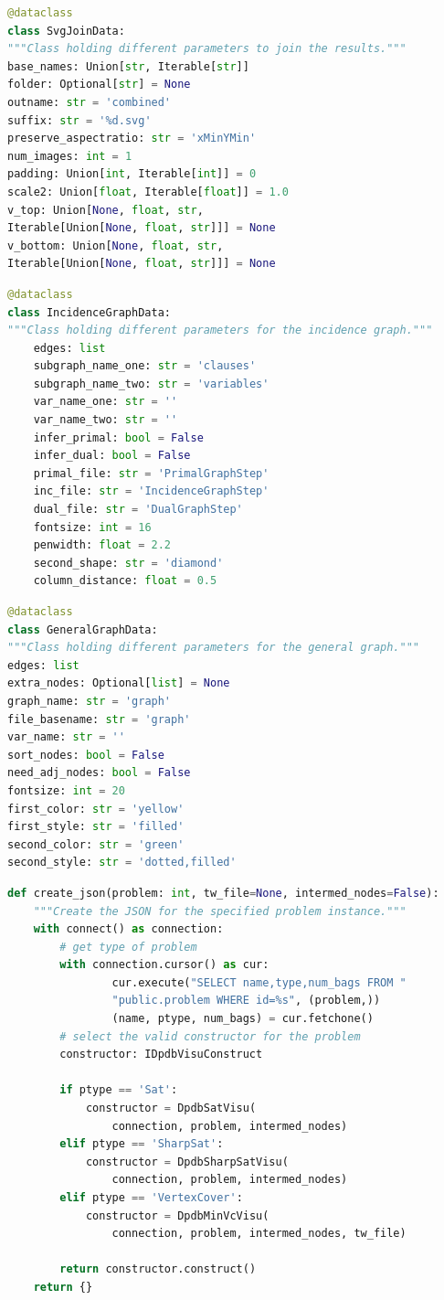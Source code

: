 \documentclass[a4paper, 12pt, bibliography=totoc]{scrartcl}
\begin{document}
\begin{lstlisting}[language={Python}, caption={SvgJoinData}, label={lst:svgjoindataclass}]
@dataclass
class SvgJoinData:
"""Class holding different parameters to join the results."""
base_names: Union[str, Iterable[str]]
folder: Optional[str] = None
outname: str = 'combined'
suffix: str = '%d.svg'
preserve_aspectratio: str = 'xMinYMin'
num_images: int = 1
padding: Union[int, Iterable[int]] = 0
scale2: Union[float, Iterable[float]] = 1.0
v_top: Union[None, float, str, 
Iterable[Union[None, float, str]]] = None
v_bottom: Union[None, float, str, 
Iterable[Union[None, float, str]]] = None	
\end{lstlisting}

\begin{lstlisting}[language={Python}, caption={IncidenceGraphData}, label={lst:incidencedata}]
@dataclass
class IncidenceGraphData:
"""Class holding different parameters for the incidence graph."""
	edges: list
	subgraph_name_one: str = 'clauses'
	subgraph_name_two: str = 'variables'
	var_name_one: str = ''
	var_name_two: str = ''
	infer_primal: bool = False
	infer_dual: bool = False
	primal_file: str = 'PrimalGraphStep'
	inc_file: str = 'IncidenceGraphStep'
	dual_file: str = 'DualGraphStep'
	fontsize: int = 16
	penwidth: float = 2.2
	second_shape: str = 'diamond'
	column_distance: float = 0.5
\end{lstlisting}

\begin{lstlisting}[language={Python}, caption={GeneralGraphData}, label={lst:gengraphdata}]
@dataclass
class GeneralGraphData:
"""Class holding different parameters for the general graph."""
edges: list
extra_nodes: Optional[list] = None
graph_name: str = 'graph'
file_basename: str = 'graph'
var_name: str = ''
sort_nodes: bool = False
need_adj_nodes: bool = False
fontsize: int = 20
first_color: str = 'yellow'
first_style: str = 'filled'
second_color: str = 'green'
second_style: str = 'dotted,filled'
\end{lstlisting}

\begin{lstlisting}[language={Python}, caption={Construct\_dpdb\_visu.py}, label={lst:create-json}]
def create_json(problem: int, tw_file=None, intermed_nodes=False):
	"""Create the JSON for the specified problem instance."""
	with connect() as connection:
		# get type of problem
		with connection.cursor() as cur:
				cur.execute("SELECT name,type,num_bags FROM "
				"public.problem WHERE id=%s", (problem,))
				(name, ptype, num_bags) = cur.fetchone()	
		# select the valid constructor for the problem
		constructor: IDpdbVisuConstruct
		
		if ptype == 'Sat':
			constructor = DpdbSatVisu(
				connection, problem, intermed_nodes)
		elif ptype == 'SharpSat':
			constructor = DpdbSharpSatVisu(
				connection, problem, intermed_nodes)
		elif ptype == 'VertexCover':
			constructor = DpdbMinVcVisu(
				connection, problem, intermed_nodes, tw_file)
		
		return constructor.construct()
	return {} 
\end{lstlisting}
\end{document}
